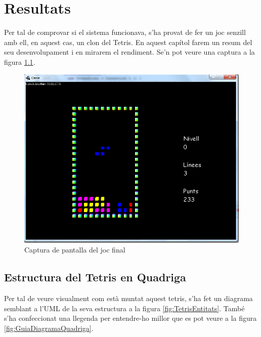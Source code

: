 \chapter{Resultats}

  Per tal de comprovar si el sistema funcionava, s'ha provat de fer un joc senzill amb ell, en aquest cas, un clon del Tetris. En aquest capítol farem un resum del seu desenvolupament i en mirarem el rendiment. Se'n pot veure una captura a la figura \ref{fig:ImatgeTetris}.

  \begin{figure}
    \includegraphics[width=1\linewidth]{./img/ImatgeTetris.png}
    \caption{Captura de pantalla del joc final \label{fig:ImatgeTetris}}
  \end{figure}

\section{Estructura del Tetris en Quadriga}

  Per tal de veure visualment com està muntat aquest tetris, s'ha fet un diagrama semblant a l'UML de la seva estructura a la figura \ref{fig:TetrisEntitats}. També s'ha confeccionat una llegenda per entendre-ho millor que es pot veure a la figura \ref{fig:GuiaDiagramaQuadriga}.

